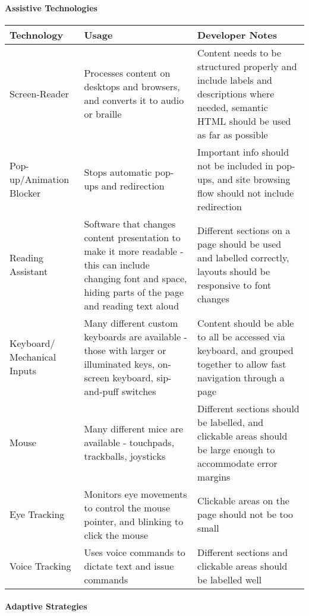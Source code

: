 \documentclass[ %
                    author={Aleena Baig},
                supervisor={Dr Simon Lock},
                    degree={BSc},
                     title={On Making Web Accessible Graphs},
                  subtitle={},
                      year={2019} ]{dissertation}
\begin{document}
\paragraph{Assistive Technologies}

\begin{center}
\begin{tabular}{|p{3cm}|p{5cm}|p{5cm}|}
 \hline
 Technology & Usage & Developer Notes \\ [0.5ex]
 \hline \hline
 Screen-Reader & Processes content on desktops and browsers, and converts it to audio or braille & Content needs to be structured properly and include labels and descriptions where needed, semantic HTML should be used as far as possible \\
 \hline
 Pop-up/Animation Blocker & Stops automatic pop-ups and redirection & Important info should not be included in pop-ups, and site browsing flow should not include redirection \\
 \hline
 Reading Assistant & Software that changes content presentation to make it more readable - this can include changing font and space, hiding parts of the page and reading text aloud & Different sections on a page should be used and labelled correctly, layouts should be responsive to font changes \\
 \hline
 Keyboard/ Mechanical Inputs & Many different custom keyboards are available - those with larger or illuminated keys, on-screen keyboard, sip-and-puff switches  & Content should be able to all be accessed via keyboard, and grouped together to allow fast navigation through a page \\
 \hline
 Mouse & Many different mice are available - touchpads, trackballs, joysticks & Different sections should be labelled, and clickable areas should be large enough to accommodate error margins\\
 \hline
 Eye Tracking & Monitors eye movements to control the mouse pointer, and blinking to click the mouse & Clickable areas on the page should not be too small \\
 \hline
 Voice Tracking & Uses voice commands to dictate text and issue commands & Different sections and clickable areas should be labelled well \\ [1ex]
 \hline
\end{tabular}
\end{center}


\paragraph{Adaptive Strategies}
\end{document}
